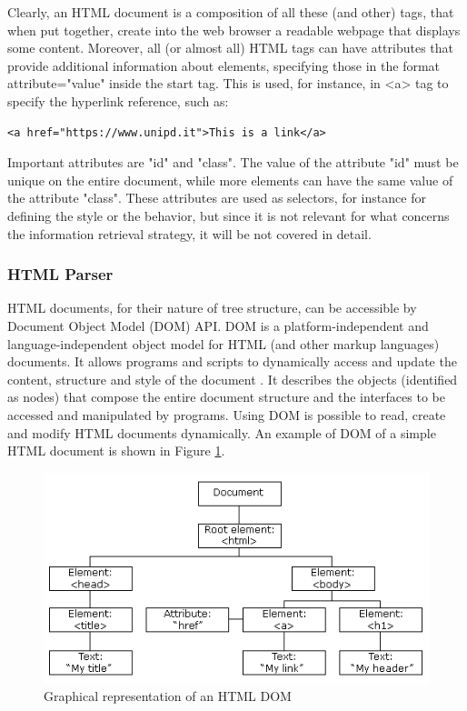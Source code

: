 Clearly, an HTML document is a composition of all these (and other) tags, that when put together, create into the web browser a readable webpage that displays some content. Moreover, all (or almost all) HTML tags can have attributes that provide additional information about elements, specifying those in the format attribute="value" inside the start tag. This is used, for instance, in <a> tag to specify the hyperlink reference, such as:
\begin{lstlisting}
<a href="https://www.unipd.it">This is a link</a>
\end{lstlisting}
Important attributes are  "id" and "class". The value of the attribute "id"  must be unique on the entire document, while more elements can have the same value of the attribute "class". These attributes are used as selectors, for instance for defining the style or the behavior, but since it is not relevant for what concerns the information retrieval strategy, it will be not covered in detail.\\


\subsubsection{HTML Parser}

HTML documents, for their nature of tree structure, can be accessible by Document Object Model (DOM) API. DOM is a platform-independent and language-independent object model for HTML (and other markup languages) documents. It allows programs and scripts to dynamically access and update the content, structure and style of the document \cite{html-dom}. It describes the objects (identified as nodes) that compose the entire document structure and the interfaces to be accessed and manipulated by programs. Using DOM is possible to read, create and modify HTML documents dynamically. An example of DOM of a simple HTML document is shown in Figure \ref{fig:html-dom}.

\begin{figure}[ht]
	\centering
	\includegraphics[width=1\textwidth]{figures/html-dom.png}
	\caption{Graphical representation of an HTML DOM}
	\label{fig:html-dom}
\end{figure}

